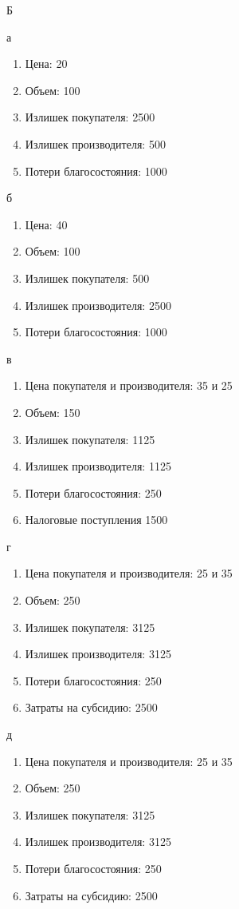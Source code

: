 \documentclass[a4paper,12pt]{article}
\begin{document}
Б

а
\begin{enumerate}
    \item Цена: 20
    \item Объем: 100
    \item Излишек покупателя: 2500
    \item Излишек производителя: 500
    \item Потери благосостояния: 1000
\end{enumerate}

б
\begin{enumerate}
    \item Цена: 40
    \item Объем: 100
    \item Излишек покупателя: 500
    \item Излишек производителя: 2500
    \item Потери благосостояния: 1000
\end{enumerate}

в
\begin{enumerate}
    \item Цена покупателя и производителя: 35 и 25
    \item Объем: 150
    \item Излишек покупателя: 1125
    \item Излишек производителя: 1125
    \item Потери благосостояния: 250
    \item Налоговые поступления 1500
\end{enumerate}

г
\begin{enumerate}
    \item Цена покупателя и производителя: 25 и 35
    \item Объем: 250
    \item Излишек покупателя: 3125
    \item Излишек производителя: 3125
    \item Потери благосостояния: 250
    \item Затраты на субсидию: 2500
\end{enumerate}

д
\begin{enumerate}
    \item Цена покупателя и производителя: 25 и 35
    \item Объем: 250
    \item Излишек покупателя: 3125
    \item Излишек производителя: 3125
    \item Потери благосостояния: 250
    \item Затраты на субсидию: 2500
\end{enumerate}
\end{document}
